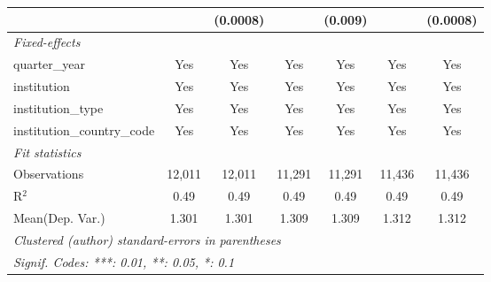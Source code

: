 \begin{tabular}{lcccccc}
                                      &              & (0.0008)     &              & (0.009)        &              & (0.0008)\\   
   \midrule
   \emph{Fixed-effects}\\
   quarter\_year                      & Yes          & Yes          & Yes          & Yes            & Yes          & Yes\\  
   institution                        & Yes          & Yes          & Yes          & Yes            & Yes          & Yes\\  
   institution\_type                  & Yes          & Yes          & Yes          & Yes            & Yes          & Yes\\  
   institution\_country\_code         & Yes          & Yes          & Yes          & Yes            & Yes          & Yes\\  
   \midrule
   \emph{Fit statistics}\\
   Observations                       & 12,011       & 12,011       & 11,291       & 11,291         & 11,436       & 11,436\\  
   R$^2$                              & 0.49         & 0.49         & 0.49         & 0.49           & 0.49         & 0.49\\  
Mean(Dep. Var.) & 1.301 & 1.301 & 1.309 & 1.309 & 1.312 & 1.312 \\
   \midrule \midrule
   \multicolumn{7}{l}{\emph{Clustered (author) standard-errors in parentheses}}\\
   \multicolumn{7}{l}{\emph{Signif. Codes: ***: 0.01, **: 0.05, *: 0.1}}\\
\end{tabular}
\par\endgroup
